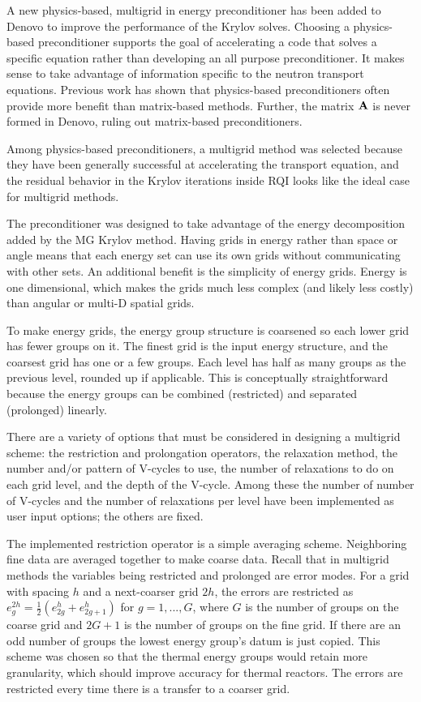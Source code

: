 A new physics-based, multigrid in energy preconditioner has been added to Denovo to improve the performance of the Krylov solves. Choosing a physics-based preconditioner supports the goal of accelerating a code that solves a specific equation rather than developing an all purpose preconditioner. It makes sense to take advantage of information specific to the neutron transport equations. Previous work has shown that physics-based preconditioners often provide more benefit than matrix-based methods. Further, the matrix $\mathbf{A}$ is never formed in Denovo, ruling out matrix-based preconditioners. 

Among physics-based preconditioners, a multigrid method was selected because they have been generally successful at accelerating the transport equation, and the residual behavior in the Krylov iterations inside RQI looks like the ideal case for multigrid methods.

The preconditioner was designed to take advantage of the energy decomposition added by the MG Krylov method. Having grids in energy rather than space or angle means that each energy set can use its own grids without communicating with other sets. An additional benefit is the simplicity of energy grids. Energy is one dimensional, which makes the grids much less complex (and likely less costly) than angular or multi-D spatial grids. 

To make energy grids, the energy group structure is coarsened so each lower grid has fewer groups on it. The finest grid is the input energy structure, and the coarsest grid has one or a few groups. Each level has half as many groups as the previous level, rounded up if applicable. This is conceptually straightforward because the energy groups can be combined (restricted) and separated (prolonged) linearly. 

There are a variety of options that must be considered in designing a multigrid scheme: the restriction and prolongation operators, the relaxation method, the number and/or pattern of V-cycles to use, the number of relaxations to do on each grid level, and the depth of the V-cycle. Among these the number of number of V-cycles and the number of relaxations per level have been implemented as user input options; the others are fixed. 

The implemented restriction operator is a simple averaging scheme. Neighboring fine data are averaged together to make coarse data. Recall that in multigrid methods the variables being restricted and prolonged are error modes. For a grid with spacing $h$ and a next-coarser grid $2h$, the errors are restricted as $e_{g}^{2h} = \frac{1}{2}(e_{2g}^{h} + e_{2g+1}^{h})$ for $g = 1,...,G$, where $G$ is the number of groups on the coarse grid and $2G+1$ is the number of groups on the fine grid. If there are an odd number of groups the lowest energy group's datum is just copied. This scheme was chosen so that the thermal energy groups would retain more granularity, which should improve accuracy for thermal reactors. The errors are restricted every time there is a transfer to a coarser grid.


